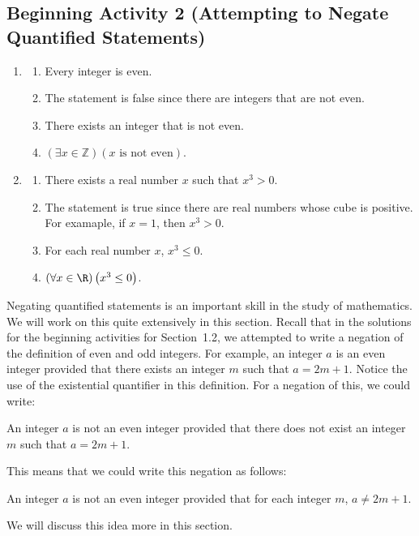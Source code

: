 \documentclass[11pt]{article}
\begin{document}
\subsection*{Beginning Activity 2 (Attempting to Negate Quantified Statements)}
\begin{enumerate}
\item \begin{enumerate}
  \item Every integer is even.
  \item The statement is false since there are integers that are not even.
  \item There exists an integer that is not even.
  \item $( {\exists x \in \mathbb{Z}} )( {x\text{ is not even}} )$.
\end{enumerate}

\item \begin{enumerate}
  \item There exists a real number $x$ such that $x^3 > 0$.
  \item The statement is true since there are real numbers whose cube is positive.  For examaple, if $x = 1$, then $x^3 > 0$.
  \item For each real number $x$, $x^3 \leq 0$.
  \item $\left( \forall x \in \R \right) \left( x^3 \leq 0 \right)$.
  \end{enumerate}
\end{enumerate}
Negating quantified statements is an important skill in the study of mathematics.  We will work on this quite extensively in this section.  Recall that in the solutions for the beginning activities for Section~1.2, we attempted to write a negation of the definition of even and odd integers.  For example, an integer $a$ is an even integer provided that there exists an integer $m$ such that $a = 2m + 1$.  Notice the use of the existential quantifier in this definition.  For a negation of this, we could write:
\begin{list}{}
\item An integer $a$ is not an even integer provided that there does not exist an integer $m$ such that $a = 2m + 1$.
\end{list}

\eighth
\noindent
This means that we could write this negation as follows:
\begin{list}{}
\item An integer $a$ is not an even integer provided that for each integer $m$,  $a \ne 2m + 1$.
\end{list}

\eighth
\noindent
We will discuss this idea more in this section.
\hbreak
\end{document}
